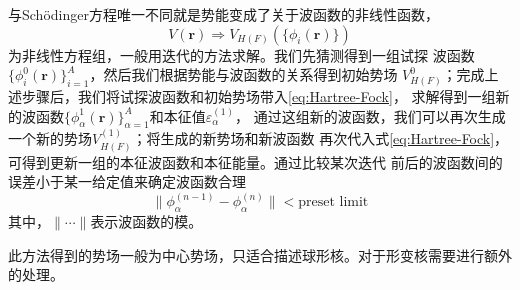 与Sch{\"o}dinger方程唯一不同就是势能变成了关于波函数的非线性函数，
\begin{equation*} V(\bm{r}) \Longrightarrow V_{H(F)}(\{\phi_{i}(\bm{r})\})
\end{equation*}
为非线性方程组，一般用迭代的方法求解。我们先猜测得到一组试探
波函数$\{\phi_i^0(\bm{r})\}_{i=1}^{A}$，然后我们根据势能与波函数的关系得到初始势场
$V_{H(F)}^{0}$；完成上述步骤后，我们将试探波函数和初始势场带入\cref{eq:Hartree-Fock}，
求解得到一组新的波函数$\{\phi_{\alpha}^1(\bm{r})\}_{\alpha=1}^{A}$和本征值$\varepsilon_{\alpha}^{(1)}$，
通过这组新的波函数，我们可以再次生成一个新的势场$V_{H(F)}^{(1)}$；将生成的新势场和新波函数
再次代入式\eqref{eq:Hartree-Fock}，可得到更新一组的本征波函数和本征能量。通过比较某次迭代
前后的波函数间的误差小于某一给定值来确定波函数合理
\begin{equation}
    \parallel \phi_{\alpha}^{(n-1)} - \phi_{\alpha}^{(n)} \parallel < \text{preset limit}
    \label{eq:iter-error}
\end{equation}
其中，$\parallel \cdots \parallel$表示波函数的模。

此方法得到的势场一般为中心势场，只适合描述球形核。对于形变核需要进行额外的处理。

